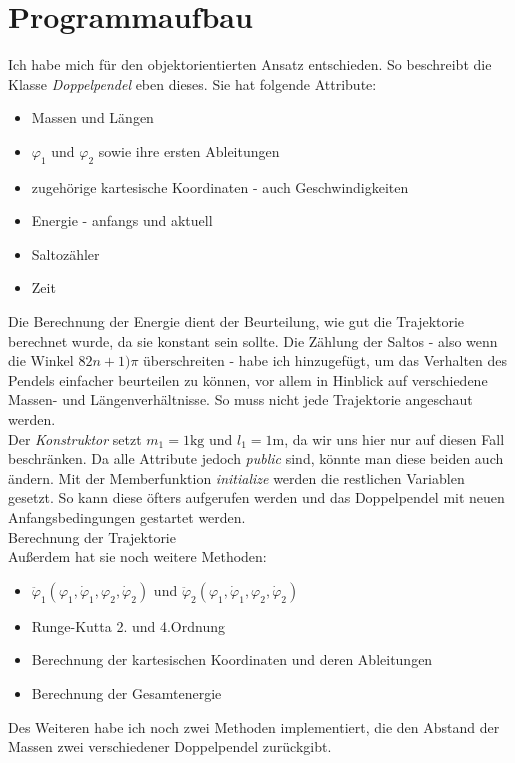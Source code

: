 \documentclass[12pt,a4paper,titlepage,headinclude,bibtotoc]{scrartcl}
\begin{document}
\section{Programmaufbau}
Ich habe mich für den objektorientierten Ansatz entschieden.
So beschreibt die Klasse \textit{Doppelpendel} eben dieses. 
Sie hat folgende Attribute:
\begin{itemize}
	\item Massen und Längen	
	\item $\varphi_1$ und $\varphi_2$ sowie ihre ersten Ableitungen
	\item zugehörige kartesische Koordinaten - auch Geschwindigkeiten
	\item Energie - anfangs und aktuell
	\item Saltozähler
	\item Zeit
\end{itemize}
Die Berechnung der Energie dient der Beurteilung, wie gut die Trajektorie berechnet wurde, da sie konstant sein sollte.
Die Zählung der Saltos - also wenn die Winkel $82n+1)\pi$ überschreiten - habe ich hinzugefügt, um das Verhalten des Pendels einfacher beurteilen zu können, vor allem in Hinblick auf verschiedene Massen- und Längenverhältnisse.
So muss nicht jede Trajektorie angeschaut werden.\\
Der \textit{Konstruktor} setzt $m_1=1\si{\kilo\gram}$ und $l_1=1\si{\meter}$, da wir uns hier nur auf diesen Fall beschränken.
Da alle Attribute jedoch \textit{public} sind, könnte man diese beiden auch ändern.
Mit der Memberfunktion \textit{initialize} werden die restlichen Variablen gesetzt.
So kann diese öfters aufgerufen werden und das Doppelpendel mit neuen Anfangsbedingungen gestartet werden.\\
Berechnung der Trajektorie\\
Außerdem hat sie noch weitere Methoden:
\begin{itemize}
	\item $\ddot{\varphi}_1\left(\varphi_1, \dot{\varphi}_1,\varphi_2, \dot{\varphi}_2\right)$ und $\ddot{\varphi}_2\left(\varphi_1, \dot{\varphi}_1,\varphi_2, \dot{\varphi}_2\right)$
	\item Runge-Kutta 2. und 4.Ordnung	
	\item Berechnung der kartesischen Koordinaten und deren Ableitungen
	\item Berechnung der Gesamtenergie
\end{itemize}

Des Weiteren habe ich noch zwei Methoden implementiert, die den Abstand der Massen zwei verschiedener Doppelpendel zurückgibt.
\end{document}
